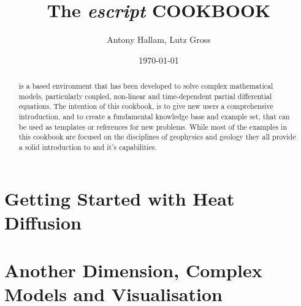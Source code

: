 \documentclass{manual}
\title{The \textit{escript} COOKBOOK}
\author{Antony Hallam, Lutz Gross}
\date{\today}
\begin{document}
\maketitle



\begin{abstract}
\esc is a \pyt based environment that has been developed to solve complex mathematical models, particularly coupled, non-linear and time-dependent partial differential equations. The intention of this cookbook, is to give new \esc users a comprehensive introduction, and to create a fundamental knowledge base and example set, that can be used as templates or references for new problems. While most of the examples in this cookbook are focused on the disciplines of geophysics and geology they all provide a solid introduction to \esc and it's capabilities.
\end{abstract}
\tableofcontents

\newpage




\chapter{Getting Started with Heat Diffusion}
\label{CHAP HEAT DIFF}



\chapter{Another Dimension, Complex Models and Visualisation}
\label{CHAP HEAT 2}



%
\end{document}
